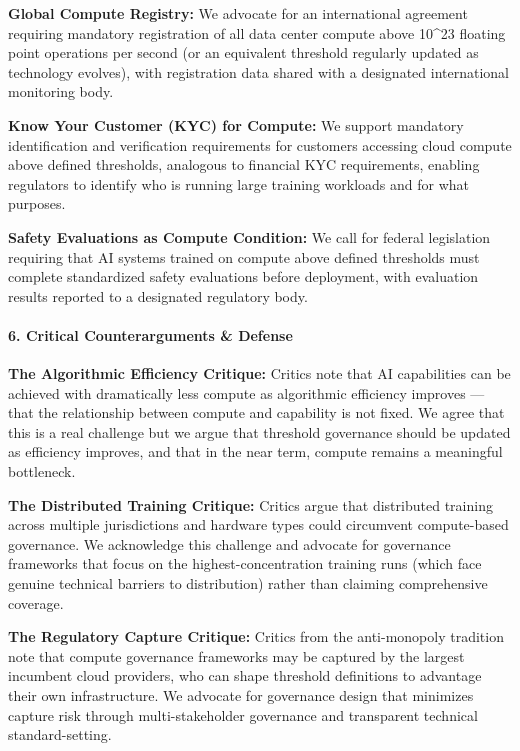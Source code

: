 \textbf{Global Compute Registry:} We advocate for an international
agreement requiring mandatory registration of all data center compute
above 10\^{}23 floating point operations per second (or an equivalent
threshold regularly updated as technology evolves), with registration
data shared with a designated international monitoring body.

\textbf{Know Your Customer (KYC) for Compute:} We support mandatory
identification and verification requirements for customers accessing
cloud compute above defined thresholds, analogous to financial KYC
requirements, enabling regulators to identify who is running large
training workloads and for what purposes.

\textbf{Safety Evaluations as Compute Condition:} We call for federal
legislation requiring that AI systems trained on compute above defined
thresholds must complete standardized safety evaluations before
deployment, with evaluation results reported to a designated regulatory
body.

\paragraph{6. Critical Counterarguments \&
Defense}\label{critical-counterarguments-defense-8}

\textbf{The Algorithmic Efficiency Critique:} Critics note that AI
capabilities can be achieved with dramatically less compute as
algorithmic efficiency improves --- that the relationship between
compute and capability is not fixed. We agree that this is a real
challenge but we argue that threshold governance should be updated as
efficiency improves, and that in the near term, compute remains a
meaningful bottleneck.

\textbf{The Distributed Training Critique:} Critics argue that
distributed training across multiple jurisdictions and hardware types
could circumvent compute-based governance. We acknowledge this challenge
and advocate for governance frameworks that focus on the
highest-concentration training runs (which face genuine technical
barriers to distribution) rather than claiming comprehensive coverage.

\textbf{The Regulatory Capture Critique:} Critics from the anti-monopoly
tradition note that compute governance frameworks may be captured by the
largest incumbent cloud providers, who can shape threshold definitions
to advantage their own infrastructure. We advocate for governance design
that minimizes capture risk through multi-stakeholder governance and
transparent technical standard-setting.

